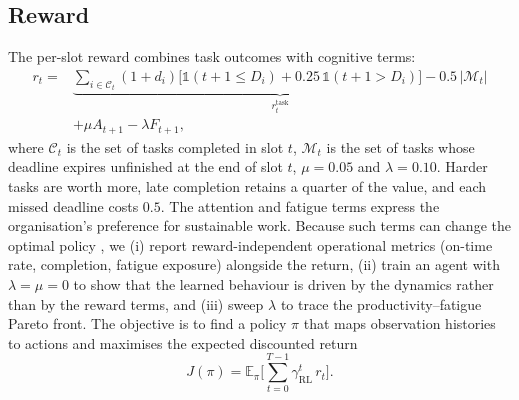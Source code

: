 \subsection{Reward}
The per-slot reward combines task outcomes with cognitive terms:
\begin{equation}
\begin{split}
r_t={}&\underbrace{\sum_{i\in\mathcal C_t}(1+d_i)\big[\mathbb 1(t+1\le D_i)+0.25\,\mathbb 1(t+1>D_i)\big]-0.5\,|\mathcal M_t|}_{r^{\text{task}}_t}\\
&+\mu A_{t+1}-\lambda F_{t+1},
\end{split}
\label{eq:reward}
\end{equation}
where $\mathcal C_t$ is the set of tasks completed in slot $t$, $\mathcal M_t$ is the set of tasks whose deadline expires unfinished at the end of slot $t$, $\mu=0.05$ and $\lambda=0.10$. Harder tasks are worth more, late completion retains a quarter of the value, and each missed deadline costs $0.5$. The attention and fatigue terms express the organisation's preference for sustainable work. Because such terms can change the optimal policy \cite{ng1999}, we (i) report reward-independent operational metrics (on-time rate, completion, fatigue exposure) alongside the return, (ii) train an agent with $\lambda=\mu=0$ to show that the learned behaviour is driven by the dynamics rather than by the reward terms, and (iii) sweep $\lambda$ to trace the productivity--fatigue Pareto front. The objective is to find a policy $\pi$ that maps observation histories to actions and maximises the expected discounted return
\begin{equation}
J(\pi)=\mathbb E_\pi\Big[\sum_{t=0}^{T-1}\gamma_{\mathrm{RL}}^t\, r_t\Big].
\label{eq:objective}
\end{equation}

